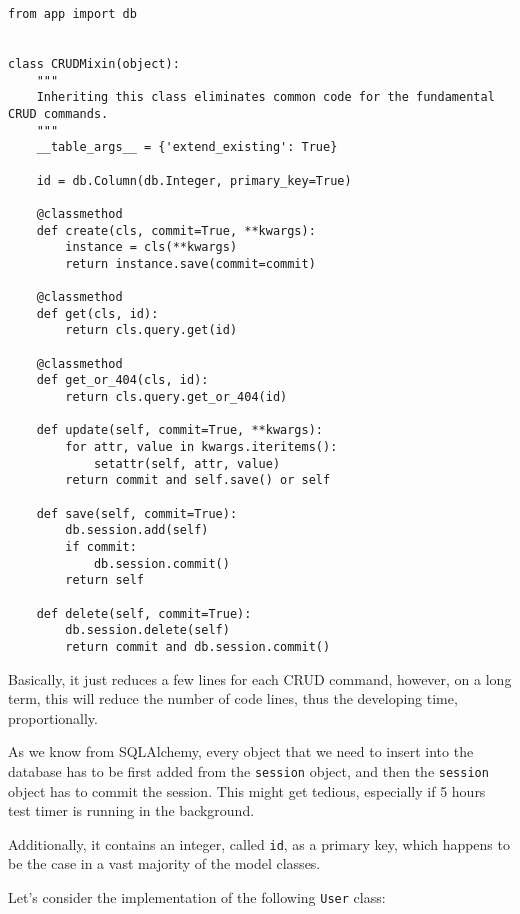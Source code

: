 \documentclass[../main/main.tex]{subfiles}
\begin{document}
\begin{lstlisting}
from app import db


class CRUDMixin(object):
    """
    Inheriting this class eliminates common code for the fundamental CRUD commands.
    """
    __table_args__ = {'extend_existing': True}

    id = db.Column(db.Integer, primary_key=True)

    @classmethod
    def create(cls, commit=True, **kwargs):
        instance = cls(**kwargs)
        return instance.save(commit=commit)

    @classmethod
    def get(cls, id):
        return cls.query.get(id)

    @classmethod
    def get_or_404(cls, id):
        return cls.query.get_or_404(id)

    def update(self, commit=True, **kwargs):
        for attr, value in kwargs.iteritems():
            setattr(self, attr, value)
        return commit and self.save() or self

    def save(self, commit=True):
        db.session.add(self)
        if commit:
            db.session.commit()
        return self

    def delete(self, commit=True):
        db.session.delete(self)
        return commit and db.session.commit()  
\end{lstlisting}

Basically, it just reduces a few lines for each CRUD command, however,
on a long term, this will reduce the number of code lines, thus the
developing time, proportionally. 

As we know from SQLAlchemy, every object that we need to insert into
the database has to be first added from the \lstinline|session|
object, and then the \lstinline|session| object has to commit the
session. This might get tedious, especially if 5 hours test timer is
running in the background.

Additionally, it contains an integer, called \lstinline|id|, as a
primary key, which happens to be the case in a vast majority of the
model classes.

Let's consider the implementation of the following \lstinline|User|
class: 
\end{document}
